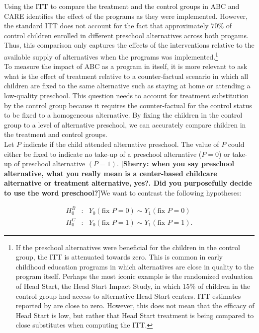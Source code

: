 \noindent Using the ITT to compare the treatment and the control groups in ABC and CARE identifies the effect of the programs as they were implemented. However, the standard ITT does not account for the fact that approximately $70 \%$ of control children enrolled in different preschool alternatives across both progams. Thus, this comparison only captures the effects of the interventions relative to the available supply of alternatives when the programs was implemented.\footnote{If the preschool alternatives were beneficial for the children in the control group, the ITT is attenuated towards zero. This is common in early childhood education programs in which alternatives are close in quality to the program itself. Perhaps the most iconic example is the randomized evaluation of Head Start, the Head Start Impact Study, in which $15\%$ of children in the control group had access to alternative Head Start centers. ITT estimates reported by \cite{Puma_Bell_etal_2010_HeadStartImpact} are close to zero. However, this does not mean that the efficacy of Head Start is low, but rather that Head Start treatment is being compared to close substitutes when computing the ITT.} \\

\noindent To measure the impact of ABC as a program in itself, it is more relevant to ask what is the effect of treatment relative to a counter-factual scenario in which all children are fixed to the same alternative such as staying at home or attending a low-quality preschool. This question needs to account for treatment substitution by the control group because it requires the counter-factual for the control status to be fixed to a homogeneous alternative. By fixing the children in the control group to a level of alternative preschool, we can accurately compare children in the treatment and control groups. \\

\noindent Let $P$ indicate if the child attended alternative preschool. The value of $P$ could either be fixed to indicate no take-up of a preschool alternative ($P = 0$) or take-up of preschool alternative $(P = 1)$. \textbf{[Sherry: when you say preschool alternative, what you really mean is a center-based childcare alternative or treatment alternative, yes?. Did you purposefully decide to use the word preschool?]}We want to contrast the following hypotheses: 

\begin{eqnarray}
H_{0}^B &:& Y_{0} \left( \text{fix } P = 0 \right) \sim Y_{1} \left( \text{fix } P = 0 \right) \\
H_{0}^C &:& Y_{0} \left( \text{fix } P = 1 \right) \sim Y_{1} \left( \text{fix } P = 1\right). 
\end{eqnarray}

